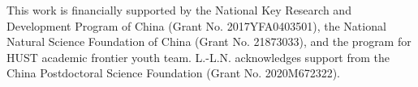 \documentclass[aps,prb,
superscriptaddress,
,twocolumn
,floatfix,footinbib,longbibliography,
]{revtex4-2}
\begin{document}

\begin{acknowledgments}
This work is financially supported by the National Key Research and Development Program of China (Grant No. 2017YFA0403501), the National Natural Science Foundation of China (Grant No. 21873033), and the program for HUST academic frontier youth team. L.-L.N. acknowledges support from the China Postdoctoral Science Foundation (Grant No. 2020M672322).
\end{acknowledgments}

%


\end{document}
